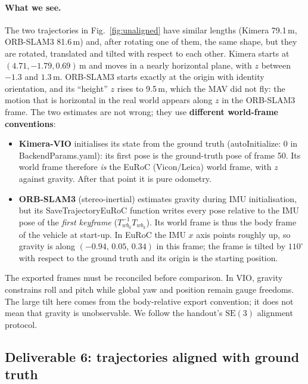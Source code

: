 \documentclass[11pt,a4paper]{article}
\DeclareRobustCommand{\code}[1]{\begingroup\ttfamily\codebreaks#1\endgroup}
\newcommand{\codebreaks}{\renewcommand{\_}{\textunderscore\allowbreak}}
\begin{document}
\paragraph{What we see.} The two trajectories in Fig.~\ref{fig:unaligned} have similar lengths
(Kimera 79.1\,m, ORB-SLAM3 81.6\,m) and, after rotating one of them, the same shape, but they are
rotated, translated and tilted with respect to each other. Kimera starts at $(4.71,-1.79,0.69)$\,m
and moves in a nearly horizontal plane, with $z$ between $-1.3$ and $1.3$\,m. ORB-SLAM3 starts
exactly at the origin with identity orientation, and its ``height'' $z$ rises to 9.5\,m, which
the MAV did not fly: the motion that is horizontal in the real world appears along $z$ in the
ORB-SLAM3 frame. The two estimates are not wrong; they use \textbf{different world-frame
conventions}:
\begin{itemize}
\item \textbf{Kimera-VIO} initialises its state from the ground truth (\code{autoInitialize: 0}
  in \code{BackendParams.yaml}):
  its first pose is the ground-truth pose of frame 50. Its world frame therefore \emph{is} the
  EuRoC (Vicon/Leica) world frame, with $z$ against gravity. After that point it is pure
  odometry.
\item \textbf{ORB-SLAM3} (stereo-inertial) estimates gravity during IMU initialisation, but
  its \code{SaveTrajectory\allowbreak EuRoC} function writes every pose relative to the IMU pose of the \emph{first
  keyframe} ($T_{w b_0}^{-1} T_{w b_k}$). Its world frame is thus the body frame of the
  vehicle at start-up. In EuRoC the IMU $x$ axis points roughly up, so gravity is along
  $(-0.94,\,0.05,\,0.34)$ in this frame; the frame is tilted by $110^\circ$ with respect to
  the ground truth and its origin is the starting position.
\end{itemize}
The exported frames must be reconciled before comparison. In VIO, gravity constrains
roll and pitch while global yaw and position remain gauge freedoms. The large tilt here
comes from the body-relative export convention; it does not mean that gravity is
unobservable. We follow the handout's $\mathrm{SE}(3)$ alignment protocol.

\subsection{Deliverable 6: trajectories aligned with ground truth}\label{sec:d6b}
\end{document}
